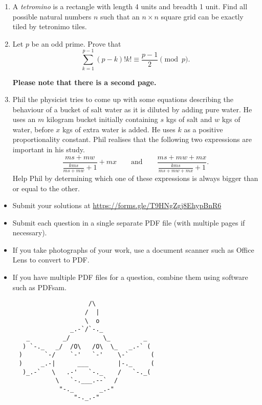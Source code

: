 \documentclass{article}
\begin{document}
\begin{enumerate}[itemsep=\fill]
\item%
A \textit{tetromino} is a rectangle with length 4 units and breadth 1 unit. Find all possible natural numbers $n$ such that an $n\times n$ square grid can be exactly tiled by tetronimo tiles.  


\item %
Let $p$ be an odd prime. Prove that
\[
	\sum_{k=1}^{p-1} (p-k)!k! \equiv \frac{p-1}{2} \pmod{p}.
\]

\vfill
\begin{center}
  \textbf{Please note that there is a second page.}
\end{center}
\clearpage


\item %
Phil the physicist tries to come up with some equations describing the behaviour of a bucket of salt water as it is diluted by adding pure water. He uses an $m$ kilogram bucket initially containing $s$ kgs of salt and $w$ kgs of water, before $x$ kgs of extra water is added. He uses $k$ as a positive proportionality constant. Phil realises that the following two expressions are important in his study. 
$$\frac{ms+mw}{\frac{kms}{ms+mw}+1} + mx \qquad\text{and}\qquad \frac{ms+mw+mx}{\frac{kms}{ms+mw+mx}+1}.$$
Help Phil by determining which one of these expressions is always bigger than or equal to the other.
\end{enumerate}


\vfill
\begin{itemize}
	\item Submit your solutions at \href{https://forms.gle/T9HNgZgj8EhypBnR6}{https://forms.gle/T9HNgZgj8EhypBnR6}
	\item Submit each question in a single separate PDF file (with multiple pages if necessary).
	\item If you take photographs of your work, use a document scanner such as Office Lens to convert to PDF.
	\item If you have multiple PDF files for a question, combine them using software such as PDFsam.
\end{itemize}

\vfill
\centering
\small
\begin{BVerbatim}
                        /\
                       /  |
                       \  o
                   _.-`/`-._
       _         _/         \_         _
      ) `-._   _/  /O\   /O\  \_   _.-` (
     )      `-/    `-'   `-'    \-`      (
     )     _.-|      ___        |-._     (
      )_.-`   \   .-'   `-._    /   `-._(
               \   `-.___.--`  /
                "-._       _.-"
                    "-._.-"
\end{BVerbatim}
\end{document}
